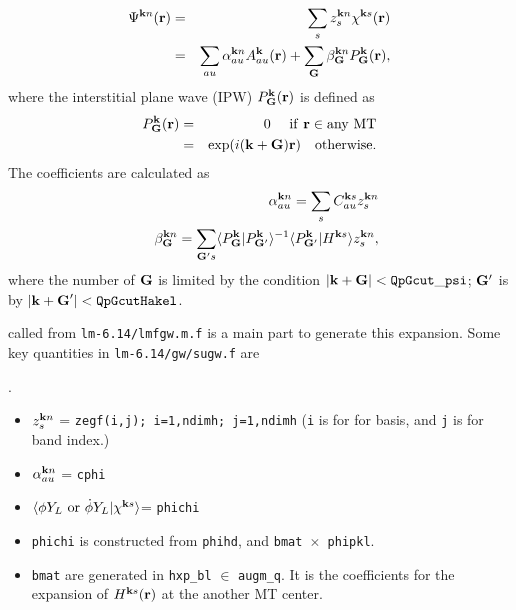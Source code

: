 \documentclass[a4paper,10pt,epsf,fleqn]{article}
\begin{document}
{{{\begin{thebibliography}{00}
\begin{eqnarray}
\label{eigenfunction}
\Psi^{{\bf k}n}({\bf r}) &=& \sum_s z^{{\bf k}n}_s \chi^{{\bf k}s}({\bf r}) \\
&=& \sum_{a u} \alpha^{{\bf k} n}_{au} A^{\bf k}_{a u}({\bf r})
 + \sum_{\bf G} \beta^{{\bf k}n}_{\bf G} P^{\bf k}_{\bf G}({\bf r}),
\end{eqnarray}
where the interstitial plane wave (IPW) $P^{\bf k}_{\bf G}({\bf r})$ 
is defined as
\begin{eqnarray}
P^{\bf k}_{\bf G}({\bf r}) &=& 0  \ \ \ {\rm \ if \ {\bf r} \in any \ MT} \nonumber \\
        &=&   \exp (i ({\bf k+G}) {\bf r}) \ \ \ {\rm otherwise}.
\end{eqnarray}
The coefficients are calculated as
\begin{eqnarray}
&&\alpha^{{\bf k} n}_{au} = \sum_s C^{{\bf k}s}_{a u} z^{{\bf k}n}_s \\
&&\beta^{{\bf k}n}_{\bf G} = \sum_{{\bf G}'s} 
\langle P^{\bf k}_{\bf G}|P^{\bf k}_{{\bf G}'}\rangle^{-1}
\langle P^{\bf k}_{{\bf G}'}|H^{{\bf k}s}\rangle z^{{\bf k}n}_s,
\end{eqnarray}
where the number of ${\bf G}$ is limited by the condition
$|{\bf k+G}|< {\tt QpGcut\_psi}$;
${\bf G}'$ is by $|{\bf k+G}'|< {\tt  QpGcutHakel}$.

\vspace{8mm}
 called from 
{\tt lm-6.14/lmfgw.m.f} is a main part to generate this expansion.
Some key quantities in {\tt lm-6.14/gw/sugw.f} are

.
\begin{itemize}
\item 
$z^{{\bf k}n}_s$ = {\tt zegf(i,j); i=1,ndimh; {\tt j=1,ndimh}} 
({\tt i} is for for basis, and {\tt j} is for band index.)
	
\item 
$\alpha^{{\bf k} n}_{au}$ = {\tt cphi}

\item
$\langle \phi Y_L {\ \rm or \ } \dot{\phi}Y_L|\chi^{{\bf k}s} \rangle$= {\tt phichi} 
	
\item 
{\tt phichi} is constructed from {\tt phihd}, and {\tt bmat $\times$ phipkl}.

\item 
{\tt bmat} are generated in {\tt hxp\_bl} $\in$ {\tt augm\_q}.
It is the coefficients for the expansion of $H^{{\bf k}s}({\bf r})$ 
at the another MT center.


\end{itemize}
\end{thebibliography}}}}
\end{document}
